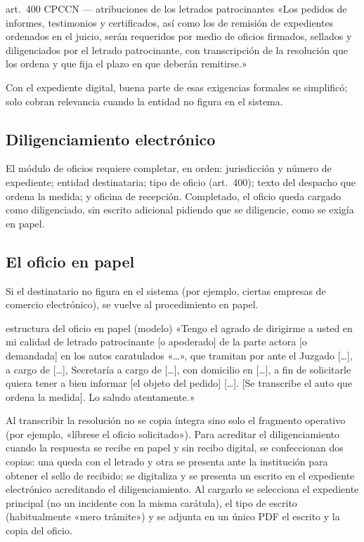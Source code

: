 \documentclass[12pt,oneside]{book}
\begin{document}
\begin{regla}{art.~400 CPCCN --- atribuciones de los letrados patrocinantes}
«Los pedidos de informes, testimonios y certificados, así como los de remisión de expedientes ordenados en el juicio, serán requeridos por medio de oficios firmados, sellados y diligenciados por el letrado patrocinante, con transcripción de la resolución que los ordena y que fija el plazo en que deberán remitirse.»
\end{regla}

Con el expediente digital, buena parte de esas exigencias formales se simplificó; solo cobran relevancia cuando la entidad no figura en el sistema.

\subsection{Diligenciamiento electrónico}

El módulo de oficios requiere completar, en orden: jurisdicción y número de expediente; entidad destinataria; tipo de oficio (art.~400); texto del despacho que ordena la medida; y oficina de recepción. Completado, el oficio queda cargado como diligenciado, sin escrito adicional pidiendo que se diligencie, como se exigía en papel.

\subsection{El oficio en papel}

Si el destinatario no figura en el sistema (por ejemplo, ciertas empresas de comercio electrónico), se vuelve al procedimiento en papel.

\begin{regla}{estructura del oficio en papel (modelo)}
«Tengo el agrado de dirigirme a usted en mi calidad de letrado patrocinante [o apoderado] de la parte actora [o demandada] en los autos caratulados «\ldots», que tramitan por ante el Juzgado [\ldots], a cargo de [\ldots], Secretaría a cargo de [\ldots], con domicilio en [\ldots], a fin de solicitarle quiera tener a bien informar [el objeto del pedido] [\ldots]. [Se transcribe el auto que ordena la medida]. Lo saludo atentamente.»
\end{regla}

Al transcribir la resolución no se copia íntegra sino solo el fragmento operativo (por ejemplo, «líbrese el oficio solicitado»). Para acreditar el diligenciamiento cuando la respuesta se recibe en papel y sin recibo digital, se confeccionan dos copias: una queda con el letrado y otra se presenta ante la institución para obtener el sello de recibido; se digitaliza y se presenta un escrito en el expediente electrónico acreditando el diligenciamiento. Al cargarlo se selecciona el expediente principal (no un incidente con la misma carátula), el tipo de escrito (habitualmente «mero trámite») y se adjunta en un único PDF el escrito y la copia del oficio.
\end{document}
